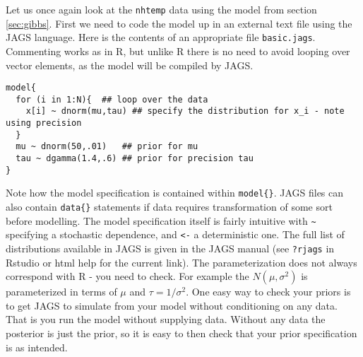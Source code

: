 \documentclass[10pt] {article}
\theoremstyle{definition}
\begin{document}
Let us once again look at the {\tt nhtemp} data using the model from section \ref{sec:gibbs}. First we need to code the model up in an external text file using the JAGS language. Here is the contents of an appropriate file {\tt basic.jags}. Commenting works as in R, but unlike R there is no need to avoid looping over vector elements, as the model will be compiled by JAGS.    
\begin{lstlisting}
model{
  for (i in 1:N){  ## loop over the data
    x[i] ~ dnorm(mu,tau) ## specify the distribution for x_i - note using precision 
  }
  mu ~ dnorm(50,.01)   ## prior for mu
  tau ~ dgamma(1.4,.6) ## prior for precision tau
}
\end{lstlisting}
Note how the model specification is contained within \lstinline+model{}+. JAGS files can also contain \lstinline+data{}+ statements if data requires transformation of some sort before modelling. The model specification itself is fairly intuitive with \verb+~+ specifying a stochastic dependence, and \verb+<-+ a deterministic one. The full list of distributions available in JAGS is given in the JAGS manual (see {\tt ?rjags} in Rstudio or html help for the current link). The parameterization does not always correspond with R - you need to check. For example the $N(\mu,\sigma^2)$ is parameterized in terms of $\mu$ and $\tau=1/\sigma^2$. One easy way to check your priors is to get JAGS to simulate from your model without conditioning on any data. That is you run the model without supplying data. Without any data the posterior is just the prior, so it is easy to then check that your prior specification is as intended. 
\end{document}

